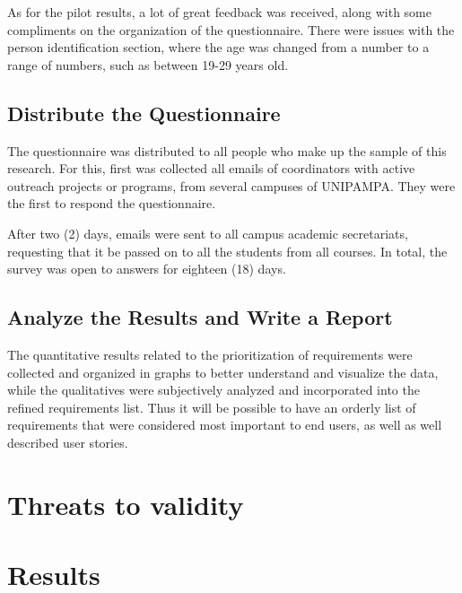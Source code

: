 As for the pilot results, a lot of great feedback was received, along with some compliments on the organization of the questionnaire. There were issues with the person identification section, where the age was changed from a number to a range of numbers, such as between 19-29 years old.

\subsection{Distribute the Questionnaire}\label{sec:survey-distribute}

The questionnaire was distributed to all people who make up the sample of this research. For this, first was collected all emails of coordinators with active outreach projects or programs, from several campuses of \ac{UNIPAMPA}. They were the first to respond the questionnaire.

After two (2) days, emails were sent to all campus academic secretariats, requesting that it be passed on to all the students from all courses. In total, the survey was open to answers for eighteen (18) days.

\subsection{Analyze the Results and Write a Report}\label{sec:survey-analyse}

The quantitative results related to the prioritization of requirements were collected and organized in graphs to better understand and visualize the data, while the qualitatives were subjectively analyzed and incorporated into the refined requirements list. Thus it will be possible to have an orderly list of requirements that were considered most important to end users, as well as well described user stories.

\section{Threats to validity}\label{sec:survey-validity}


\section{Results}\label{sec:survey-results}